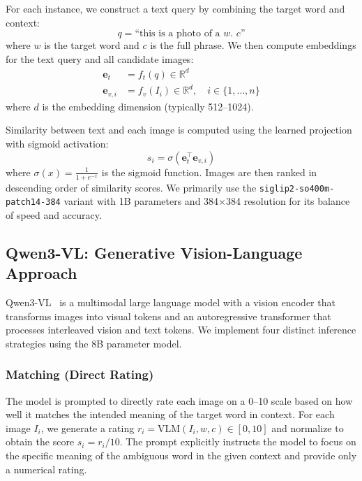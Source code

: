 \documentclass[11pt]{article}
\begin{document}
For each instance, we construct a text query by combining the target word and context:
\begin{equation}
q = \text{``this is a photo of a } w \text{. } c\text{''}
\end{equation}
where $w$ is the target word and $c$ is the full phrase. We then compute embeddings for the text query and all candidate images:
\begin{align}
\mathbf{e}_t &= f_t(q) \in \mathbb{R}^d \\
\mathbf{e}_{v,i} &= f_v(I_i) \in \mathbb{R}^d, \quad i \in \{1, \ldots, n\}
\end{align}
where $d$ is the embedding dimension (typically 512--1024).

Similarity between text and each image is computed using the learned projection with sigmoid activation:
\begin{equation}
s_i = \sigma(\mathbf{e}_t^\top \mathbf{e}_{v,i})
\end{equation}
where $\sigma(x) = \frac{1}{1 + e^{-x}}$ is the sigmoid function. Images are then ranked in descending order of similarity scores. We primarily use the \texttt{siglip2-so400m-patch14-384} variant with 1B parameters and 384$\times$384 resolution for its balance of speed and accuracy.

\subsection{Qwen3-VL: Generative Vision-Language Approach}
\label{subsec:qwen3vl}

Qwen3-VL~\cite{yang2025qwen3} is a multimodal large language model with a vision encoder that transforms images into visual tokens and an autoregressive transformer that processes interleaved vision and text tokens. We implement four distinct inference strategies using the 8B parameter model.

\subsubsection{Matching (Direct Rating)}
\label{subsubsec:matching}

The model is prompted to directly rate each image on a 0--10 scale based on how well it matches the intended meaning of the target word in context. For each image $I_i$, we generate a rating $r_i = \text{VLM}(I_i, w, c) \in [0, 10]$ and normalize to obtain the score $s_i = r_i/10$. The prompt explicitly instructs the model to focus on the specific meaning of the ambiguous word in the given context and provide only a numerical rating.
\end{document}

